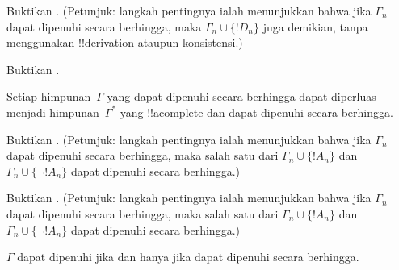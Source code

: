 \documentclass[../../../include/open-logic-section]{subfiles}
\begin{document}
\begin{prob}
Buktikan . (Petunjuk: langkah
pentingnya ialah menunjukkan bahwa jika $\Gamma_n$ dapat dipenuhi secara
berhingga, maka $\Gamma_n \cup \{!D_n\}$ juga demikian, tanpa menggunakan
!!{derivation} ataupun konsistensi.)
\end{prob}
\tagendprob


\begin{prob}
Buktikan .
\end{prob}
\tagendprob

\begin{lem}
 Setiap himpunan~$\Gamma$ yang dapat
dipenuhi secara berhingga dapat diperluas menjadi himpunan~$\Gamma^*$
yang !!a{complete} dan dapat dipenuhi secara berhingga.
\end{lem}

\begin{prob}
Buktikan . (Petunjuk: langkah
pentingnya ialah menunjukkan bahwa jika $\Gamma_n$ dapat dipenuhi secara
berhingga, maka salah satu dari $\Gamma_n \cup \{!A_n\}$ dan $\Gamma_n
\cup \{\lnot !A_n\}$ dapat dipenuhi secara berhingga.)
\end{prob}
\tagendprob

\begin{prob}
Buktikan . (Petunjuk: langkah
pentingnya ialah menunjukkan bahwa jika $\Gamma_n$ dapat dipenuhi secara
berhingga, maka salah satu dari $\Gamma_n \cup \{!A_n\}$ dan $\Gamma_n
\cup \{\lnot !A_n\}$ dapat dipenuhi secara berhingga.)
\end{prob}
\tagendprob

\begin{thm}[Kekompakan]
 $\Gamma$ dapat dipenuhi jika dan hanya
jika dapat dipenuhi secara berhingga.
\end{thm}
\end{document}
